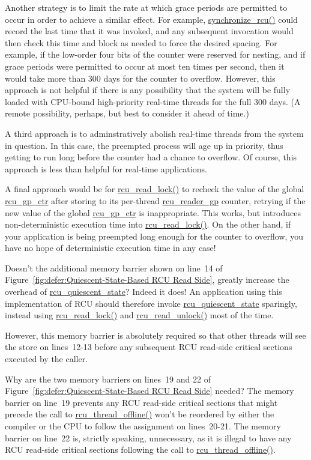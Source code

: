 	Another strategy is to limit the rate at which grace periods are
	permitted to occur in order to achieve a similar effect.
	For example, \url{synchronize_rcu()} could record the last time
	that it was invoked, and any subsequent invocation would then
	check this time and block as needed to force the desired
	spacing.
	For example, if the low-order four bits of the counter were
	reserved for nesting, and if grace periods were permitted to
	occur at most ten times per second, then it would take more
	than 300 days for the counter to overflow.
	However, this approach is not helpful if there is any possibility
	that the system will be fully loaded with CPU-bound high-priority
	real-time threads for the full 300 days.
	(A remote possibility, perhaps, but best to consider it ahead
	of time.)

	A third approach is to adminstratively abolish real-time threads
	from the system in question.
	In this case, the preempted process will age up in priority,
	thus getting to run long before the counter had a chance to
	overflow.
	Of course, this approach is less than helpful for real-time
	applications.

	A final approach would be for \url{rcu_read_lock()} to recheck
	the value of the global \url{rcu_gp_ctr} after storing to its
	per-thread \url{rcu_reader_gp} counter, retrying if the new
	value of the global \url{rcu_gp_ctr} is inappropriate.
	This works, but introduces non-deterministic execution time
	into \url{rcu_read_lock()}.
	On the other hand, if your application is being preempted long
	enough for the counter to overflow, you have no hope of
	deterministic execution time in any case!


\QuickQ{}
	Doesn't the additional memory barrier shown on line~14 of
	Figure~\ref{fig:defer:Quiescent-State-Based RCU Read Side},
	greatly increase the overhead of \url{rcu_quiescent_state}?
\QuickA{}
	Indeed it does!
	An application using this implementation of RCU should therefore
	invoke \url{rcu_quiescent_state} sparingly, instead using
	\url{rcu_read_lock()} and \url{rcu_read_unlock()} most of the
	time.

	However, this memory barrier is absolutely required so that
	other threads will see the store on lines~12-13 before any
	subsequent RCU read-side critical sections executed by the
	caller.

\QuickQ{}
	Why are the two memory barriers on lines~19 and 22 of
	Figure~\ref{fig:defer:Quiescent-State-Based RCU Read Side}
	needed?
\QuickA{}
	The memory barrier on line~19 prevents any RCU read-side
	critical sections that might precede the
	call to \url{rcu_thread_offline()} won't be reordered by either
	the compiler or the CPU to follow the assignment on lines~20-21.
	The memory barrier on line~22 is, strictly speaking, unnecessary,
	as it is illegal to have any RCU read-side critical sections
	following the call to \url{rcu_thread_offline()}.

